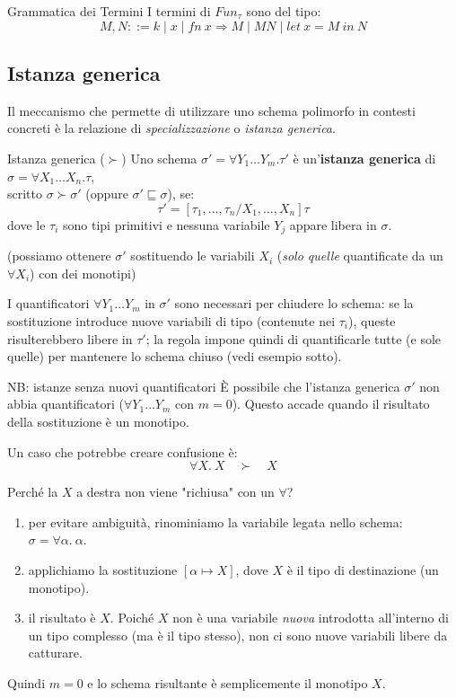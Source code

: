 \documentclass[a4paper,11pt]{report}
\begin{document}
\begin{defframe}{Grammatica dei Termini}{}
    I termini di \( Fun_{\tau} \) sono del tipo:
    \[ M, N ::= k \mid x \mid fn \ x\Rightarrow M \mid M N \mid let \ x = M \ in \ N \]
\end{defframe}
\subsection{Istanza generica}
Il meccanismo che permette di utilizzare uno schema polimorfo in contesti concreti è la relazione di \textit{specializzazione} o \textit{istanza generica}.

\begin{defframe}{Istanza generica ($\succ$)}{}
    Uno schema $\sigma' = \forall Y_1 \dots Y_m . \tau'$ è un'\textbf{istanza generica} di $\sigma = \forall X_1 \dots X_n . \tau$,\\ scritto $\sigma \succ \sigma'$ (oppure $\sigma' \sqsubseteq \sigma$), se:
    \[ \tau' = [\tau_1, \dots, \tau_n / X_1, \dots, X_n] \tau \]
    dove le $\tau_i$ sono tipi primitivi e nessuna variabile $Y_j$ appare libera in $\sigma$.

    {\color{CadetBlue}(possiamo ottenere $\sigma'$ sostituendo le variabili \( X_i \) (\textit{solo quelle} quantificate da un \( \forall X_i \)) con dei monotipi)}

    \begin{gframe}{}
    I quantificatori $\forall Y_1 \dots Y_m$ in $\sigma'$ sono necessari per chiudere lo schema: se la sostituzione introduce nuove variabili di tipo (contenute nei $\tau_i$), queste risulterebbero libere in $\tau'$; la regola impone quindi di quantificarle tutte (e sole quelle) per mantenere lo schema chiuso (vedi esempio sotto).
    \end{gframe}

\begin{gframe}{NB: istanze senza nuovi quantificatori}
    È possibile che l'istanza generica $\sigma'$ non abbia quantificatori ($\forall Y_1 \dots Y_m$ con $m=0$). Questo accade quando il risultato della sostituzione è un monotipo.
    
    Un caso che potrebbe creare confusione è:
    \[ \forall X.\ X \quad \succ \quad X \]
    
    Perché la $X$ a destra non viene "richiusa" con un $\forall$?
    \begin{enumerate}
        \item per evitare ambiguità, rinominiamo la variabile legata nello schema: $\sigma = \forall \alpha.\ \alpha$.
        \item applichiamo la sostituzione $[\alpha \mapsto X]$, dove $X$ è il tipo di destinazione (un monotipo).
        \item il risultato è $X$. Poiché $X$ non è una variabile \textit{nuova} introdotta all'interno di un tipo complesso (ma è il tipo stesso), non ci sono nuove variabili libere da catturare.
    \end{enumerate}
    Quindi $m=0$ e lo schema risultante è semplicemente il monotipo $X$.
\end{gframe}

\end{defframe}
\end{document}
